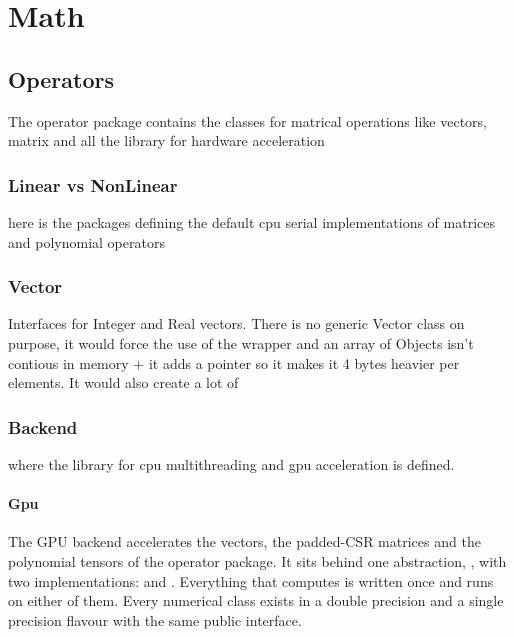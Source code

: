 \documentclass[main.tex]{subfiles}
\begin{document}
    \ifSubfilesClassLoaded{\tableofcontents}{}

    \part{Math}


    \chapter{Operators}

    The operator package contains the classes for matrical operations like vectors, matrix and all the library for hardware acceleration

    \section{Linear vs NonLinear}

    here is the packages defining the default cpu serial implementations of matrices and polynomial operators

    \section{Vector}

    Interfaces for Integer and Real vectors. There is no generic Vector class on purpose, it would force the use of the wrapper and an array of Objects isn't contious in memory + it adds a pointer so it makes it 4 bytes heavier per elements. It would also create a lot of


    \section{Backend}

    where the library for cpu multithreading and gpu acceleration is defined.



    \subsection{Gpu}

    The GPU backend accelerates the vectors, the padded-CSR matrices and the polynomial tensors of the operator package. It sits behind one abstraction, , with two implementations:  and . Everything that computes is written once and runs on either of them. Every numerical class exists in a double precision and a single precision flavour with the same public interface.
\end{document}
